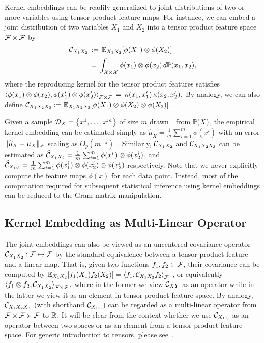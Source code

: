 \documentclass{article}
\newcommand{\hmu}{\widehat{\mu}}
\begin{document}
Kernel embeddings can be readily generalized to joint distributions of two or more variables using tensor product feature maps. For instance, we can embed a joint distribution of two variables $X_1$ and $X_2$ into a tensor product feature space $\mathcal{F}\times \mathcal{F}$ by
\begin{align*}
    \mathcal{C}_{X_1X_2} \, &:= \, \mathbb{E}_{X_1X_2}[\phi(X_1)\otimes \phi(X_2)] \\
    \, &= \, \int_{\mathcal{X} \times \mathcal{X}} \phi(x_1) \otimes \phi(x_2) \, d\mathbb{P}(x_1, x_2),
\end{align*}
where the reproducing kernel for the tensor product features satisfies
$
	\left\langle \phi(x_1)\otimes \phi(x_2) ,\phi(x_1')\otimes \phi(x_2')  \right\rangle_{\mathcal{F}\times \mathcal{F}} \, = \,  \kappa(x_1,x_1')\,\kappa(x_2,x_2').
$
By analogy, we can also define $\mathcal{C}_{X_1X_2X_3} := \mathbb{E}_{X_1X_2X_3}[\phi(X_1)\otimes\phi(X_2)\otimes \phi(X_3)]$.

Given a sample $\mathcal{D}_{X} = \left\{x^1, \ldots, x^m\right\}$ of size $m$ drawn~\iid~from $\mathbb{P}(X)$, the empirical kernel embedding can be estimated simply as
$\hmu_{X} = \frac{1}{m} \sum\nolimits_{i=1}^m \phi(x^i)$ with an error $\|\hmu_X - \mu_X \|_{\Fcal}$ scaling as $O_p(m^{-\frac{1}{2}})$~\cite{SmoGreSonSch07}.
Similarly, $\mathcal{C}_{X_1X_2}$ and $\mathcal{C}_{X_1X_2X_3}$ can be estimated as
$
 \widehat {\mathcal{C}}_{X_1X_2} =\frac{1}{m}\sum\nolimits_{i=1}^m \phi(x_1^i) \otimes \phi(x_2^i)
$, and
$\widehat {\mathcal{C}}_{X_{1:3}} = \frac{1}{m} \sum_{i = 1}^m \phi(x_1^i) \otimes \phi(x_2^i) \otimes \phi(x_3^i)$ respectively.
Note that we never explicitly compute the feature maps $\phi(x)$ for each data point. Instead, most of the computation required for subsequent statistical inference using kernel embeddings can be reduced to the Gram matrix manipulation.

\vspace{-3mm}
\subsection{Kernel Embedding as Multi-Linear Operator}
\vspace{-2mm}

The joint embeddings can also be viewed as an uncentered covariance operator $\mathcal{C}_{X_1X_2}:\mathcal{F}\mapsto \mathcal{F}$ by the standard equivalence between a tensor product feature and a linear map.
That is, given two functions $f_1,f_2\in\mathcal{F}$, their covariance can be computed by
$
    \mathbb{E}_{X_1X_2}[f_1(X_1)f_2(X_2)]=\left\langle f_1,\mathcal{C}_{X_1X_2} f_2 \right\rangle_{\mathcal{F}}
$
, or equivalently
$
\left\langle f_1\otimes f_2,\mathcal{C}_{X_1X_2} \right\rangle_{\mathcal{F}\times\mathcal{F}},
$
where in the former we view $\mathcal{C}_{XY}$ as an operator while in the latter we view it as an element in tensor product feature space.
By analogy, $\mathcal{C}_{X_1X_2X_3}$ (with shorthand $\mathcal{C}_{X_{1:3}}$) can be regarded as a multi-linear operator from $\mathcal{F}\times\mathcal{F}\times\mathcal{F}$ to $\mathbb{R}$.
It will be clear from the context whether we use $\mathcal{C}_{X_{1:3}}$ as an operator between two spaces or as an element from a tensor product feature space. For generic introduction to tensors, please see~\cite{KolBad09}.
\end{document}

